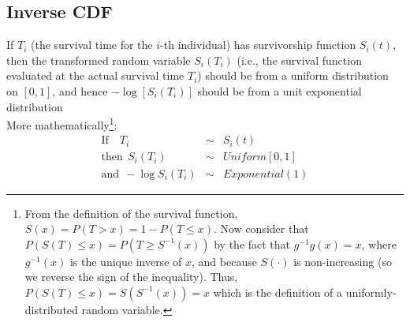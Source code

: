 \documentclass[11pt]{book}
\begin{document}
\subsection{Inverse CDF} If $T_i$ (the survival time for the $i$-th
individual) has survivorship function $S_i(t)$, then the transformed
random variable $S_i(T_i)$ (i.e., the survival function evaluated at
the actual survival time $T_i$) should be from a uniform
distribution on $[0,1]$, and hence $-\log[S_i(T_i)]$ should be from
a unit exponential distribution
\\[2ex]
    More mathematically\footnote{
    From the definition of the survival function, $S(x)=P(T>x)=1-P(T\leq x)$. Now consider that $P(S(T)\leq x)=P(T\geq S^{-1}(x))$ by the fact that $g^{-1}g(x)=x$, where $g^{-1}(x)$ is the unique inverse of $x$, and because $S(\cdot)$ is non-increasing (so we reverse the sign of the inequality).  Thus, $P(S(T)\leq x)=S(S^{-1}(x))=x$ which is the definition of a uniformly-distributed random variable.}:
\begin{eqnarray*}
\mbox{If ~~} T_i  & \sim & S_i(t)\\[1ex]
\mbox{then}~~ S_i(T_i) & \sim &  Uniform[0,1]\\[1ex]
\mbox{and}~~ -\log S_i(T_i) & \sim & Exponential(1)
\end{eqnarray*}
\end{document}
